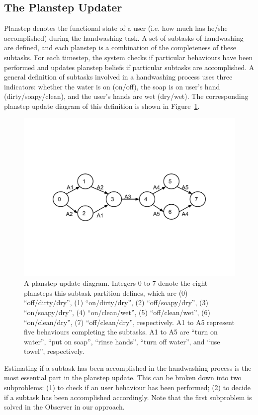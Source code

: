 \subsection{The Planstep Updater}

Planstep denotes the functional state of a user (i.e. how much has he/she accomplished) during the handwashing task. A set of subtasks of handwashing are defined, and each planstep is a combination of the completeness of these subtasks. For each timestep, the system checks if particular behaviours have been performed and updates planstep beliefs if particular subtasks are accomplished. A general definition of subtasks involved in a handwashing process uses three indicators: whether the water is on (on/off), the soap is on user's hand (dirty/soapy/clean), and the user's hands are wet (dry/wet). The corresponding planstep update diagram of this definition is shown in Figure~\ref{fig:planstep}.

\begin{figure}[h!]
\centering
\includegraphics[width=0.9\linewidth]{fig-planstep.pdf}
\caption{A planstep update diagram. Integers 0 to 7 denote the eight plansteps this subtask partition defines, which are (0) ``off/dirty/dry'', (1) ``on/dirty/dry'', (2) ``off/soapy/dry'', (3) ``on/soapy/dry'', (4) ``on/clean/wet'', (5) ``off/clean/wet'', (6) ``on/clean/dry'', (7) ``off/clean/dry'', respectively. A1 to A5 represent five behaviours completing the subtasks. A1 to A5 are ``turn on water'', ``put on soap'', ``rinse hands'', ``turn off water'', and ``use towel'', respectively.}
\label{fig:planstep}
\end{figure}

Estimating if a subtask has been accomplished in the handwashing process is the most essential part in the planstep update. This can be broken down into two subproblems: (1) to check if an user behaviour has been performed; (2) to decide if a subtask has been accomplished accordingly. Note that the first subproblem is solved in the Observer in our approach.


